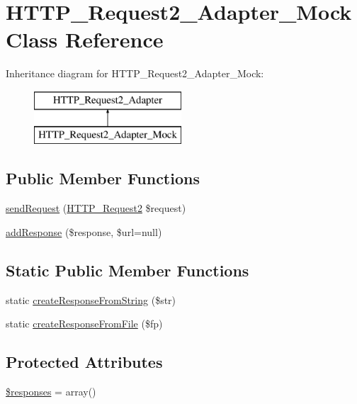 \hypertarget{classHTTP__Request2__Adapter__Mock}{}\section{H\+T\+T\+P\+\_\+\+Request2\+\_\+\+Adapter\+\_\+\+Mock Class Reference}
\label{classHTTP__Request2__Adapter__Mock}
Inheritance diagram for H\+T\+T\+P\+\_\+\+Request2\+\_\+\+Adapter\+\_\+\+Mock\+:\begin{figure}[H]
\begin{center}
\leavevmode
\includegraphics[height=2.000000cm]{classHTTP__Request2__Adapter__Mock}
\end{center}
\end{figure}
\subsection*{Public Member Functions}
\begin{DoxyCompactItemize}
\item 
\hyperlink{classHTTP__Request2__Adapter__Mock_ab85697c5438cc9b4c834ac6f15c46247}{send\+Request} (\hyperlink{classHTTP__Request2}{H\+T\+T\+P\+\_\+\+Request2} \$request)
\item 
\hyperlink{classHTTP__Request2__Adapter__Mock_a35bbf7a977f9711d4a965b220e11c291}{add\+Response} (\$response, \$url=null)
\end{DoxyCompactItemize}
\subsection*{Static Public Member Functions}
\begin{DoxyCompactItemize}
\item 
static \hyperlink{classHTTP__Request2__Adapter__Mock_a0732ba355bbab5c382378be5169084f0}{create\+Response\+From\+String} (\$str)
\item 
static \hyperlink{classHTTP__Request2__Adapter__Mock_ae767247efbe46fa5f1d5bf4363c2eb52}{create\+Response\+From\+File} (\$fp)
\end{DoxyCompactItemize}
\subsection*{Protected Attributes}
\begin{DoxyCompactItemize}
\item 
\hyperlink{classHTTP__Request2__Adapter__Mock_a2717aa3ac157e464e3c71892bb4dd1a1}{\$responses} = array()
\end{DoxyCompactItemize}

